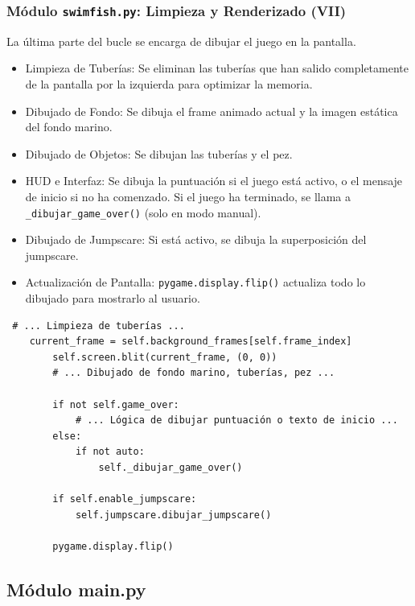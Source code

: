 \documentclass[
	11pt, %
]{beamer}
\begin{document}
\begin{frame}[fragile] \frametitle{Módulo \texttt{swimfish.py}: Limpieza y Renderizado (VII)}

La última parte del bucle se encarga de dibujar el juego en la pantalla.

\begin{itemize} \item Limpieza de Tuberías: Se eliminan las tuberías que han salido completamente de la pantalla por la izquierda para optimizar la memoria. \item Dibujado de Fondo: Se dibuja el frame animado actual y la imagen estática del fondo marino. \item Dibujado de Objetos: Se dibujan las tuberías y el pez. \item HUD e Interfaz: Se dibuja la puntuación si el juego está activo, o el mensaje de inicio si no ha comenzado. Si el juego ha terminado, se llama a \texttt{_dibujar_game_over()} (solo en modo manual). \item Dibujado de Jumpscare: Si está activo, se dibuja la superposición del jumpscare. \item Actualización de Pantalla: \texttt{pygame.display.flip()} actualiza todo lo dibujado para mostrarlo al usuario. \end{itemize}

\vspace{4pt} {\scriptsize \begin{verbatim} # ... Limpieza de tuberías ...
    current_frame = self.background_frames[self.frame_index]
        self.screen.blit(current_frame, (0, 0))
        # ... Dibujado de fondo marino, tuberías, pez ...

        if not self.game_over:
            # ... Lógica de dibujar puntuación o texto de inicio ...
        else:
            if not auto:
                self._dibujar_game_over()

        if self.enable_jumpscare:
            self.jumpscare.dibujar_jumpscare()

        pygame.display.flip()
\end{verbatim} } \end{frame}


\subsection{Módulo main.py}

\end{document}

